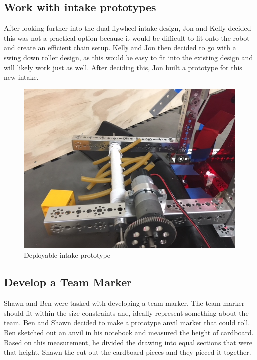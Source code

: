 \documentclass{article}
\newif\ifcontents
\begin{document}
\contentsfalse

\subsection{Work with intake prototypes}
After looking further into the dual flywheel intake design, Jon and Kelly decided this was not a practical option because it would be difficult to fit onto the robot and create an efficient chain setup. Kelly and Jon then decided to go with a swing down roller design, as this would be easy to fit into the existing design and will likely work just as well. After deciding this, Jon built a prototype for this new intake. 

\begin{figure}
    \centering
    \includegraphics[width=.6\textwidth]{03_09-17/images/IMG_0262.JPG}
    \caption{Deployable intake prototype}
    \label{fig:my_label}
\end{figure}

\subsection{Develop a Team Marker}
Shawn and Ben were tasked with developing a team marker. The team marker should fit within the size constraints and, ideally represent something about the team. Ben and Shawn decided to make a prototype anvil marker that could roll. Ben sketched out an anvil in his notebook and measured the height of cardboard. Based on this measurement, he divided the drawing into equal sections that were that height. Shawn the cut out the cardboard pieces and they pieced it together.
\end{document}
